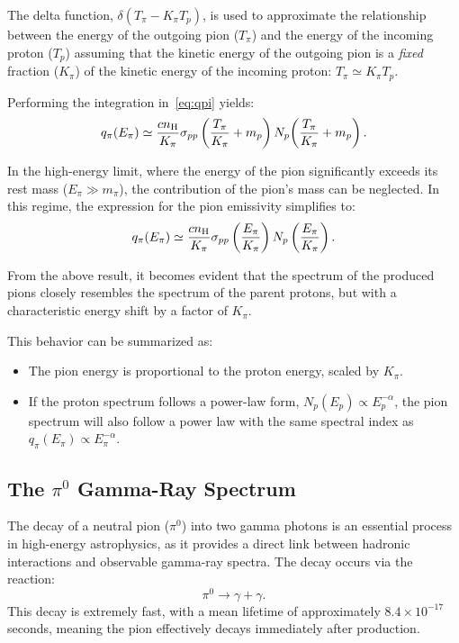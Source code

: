 
The delta function, \(\delta(T_\pi - K_\pi T_p)\), is used to approximate the relationship between the energy of the outgoing pion (\(T_\pi\)) and the energy of the incoming proton (\(T_p\)) assuming that the kinetic energy of the outgoing pion is a \emph{fixed} fraction (\(K_\pi\)) of the kinetic energy of the incoming proton:
\( T_\pi \simeq K_\pi T_p \).

Performing the integration in~\ref{eq:qpi} yields:
%
\begin{equation}
q_\pi (E_\pi) \simeq \frac{c n_{\rm H}}{K_\pi} \sigma_{pp} \left(\frac{T_\pi}{K_\pi} + m_p \right) N_p \! \left(\frac{T_\pi}{K_\pi} + m_p \right).
\end{equation}

In the high-energy limit, where the energy of the pion significantly exceeds its rest mass (\(E_\pi \gg m_\pi\)), the contribution of the pion’s mass can be neglected. In this regime, the expression for the pion emissivity simplifies to:
%
\begin{equation}
q_\pi (E_\pi) \simeq \frac{c n_{\rm H}}{K_\pi} \sigma_{pp} \left( \frac{E_\pi}{K_\pi} \right) N_p \left( \frac{E_\pi}{K_\pi} \right).
\end{equation}

From the above result, it becomes evident that the spectrum of the produced pions closely resembles the spectrum of the parent protons, but with a characteristic energy shift by a factor of \(K_\pi\).  

This behavior can be summarized as:
%
\begin{itemize}
\item The pion energy is proportional to the proton energy, scaled by \(K_\pi\).  
\item If the proton spectrum follows a power-law form, \(N_p(E_p) \propto E_p^{-\alpha}\), the pion spectrum will also follow a power law with the same spectral index as \( q_\pi(E_\pi) \propto E_\pi^{-\alpha} \).
\end{itemize}

\subsection{The \(\pi^0\) Gamma-Ray Spectrum }

The decay of a neutral pion (\(\pi^0\)) into two gamma photons is an essential process in high-energy astrophysics, as it provides a direct link between hadronic interactions and observable gamma-ray spectra. The decay occurs via the reaction:  
\begin{equation}
\pi^0 \rightarrow \gamma + \gamma.
\end{equation}  
This decay is extremely fast, with a mean lifetime of approximately \(8.4 \times 10^{-17}\) seconds, meaning the pion effectively decays immediately after production.  

